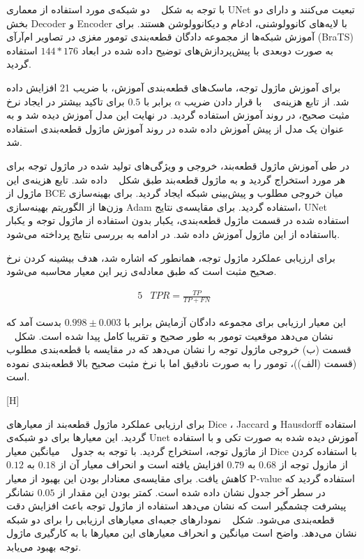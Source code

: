 
با توجه به شکل ~ دو شبکه‌ی مورد استفاده از معماری UNet تبعیت می‌کنند و دارای دو بخش Decoder و Encoder با لایه‌های کانوولوشنی، ادغام و دیکانوولوشن هستند. برای آموزش شبکه‌ها از مجموعه دادگان قطعه‌بندی تومور مغزی در تصاویر ام‌آرآی (BraTS) به صورت دوبعدی با پیش‌پردازش‌های توضیح داده شده در ابعاد $144*176$ استفاده گردید.

برای آموزش ماژول توجه، ماسک‌های قطعه‌بندی آموزش، با ضریب 21 افزایش داده‌ شد. از تابع هزینه‌ی ~ با قرار دادن ضریب $\alpha$ برابر با $0.5$ برای تاکید بیشتر در ایجاد نرخ مثبت صحیح، در روند آموزش استفاده گردید. در نهایت این مدل آموزش دیده شد و به عنوان یک مدل از پیش آموزش داده شده در روند آموزش ماژول قطعه‌بندی استفاده شد. 

در طی آموزش ماژول قطعه‌بند، خروجی و ویژگی‌های تولید شده در ماژول توجه برای هر مورد استخراج گردید و به ماژول قطعه‌بند طبق شکل ~ داده شد. تابع هزینه‌ی این ماژول از BCE میان خروجی مطلوب و پیش‌بینی شبکه ایجاد گردید. برای بهینه‌سازی وزن‌ها از الگوریتم بهینه‌سازی Adam استفاده گردید. برای مقایسه‌ی نتایج، UNet استفاده شده در قسمت ماژول قطعه‌بندی، یکبار بدون استفاده از ماژول توجه و یکبار بااستفاده از این ماژول آموزش داده شد. در ادامه به بررسی نتایج پرداخته می‌شود.


برای ارزیابی عملکرد ماژول توجه، همانطور که اشاره شد، هدف بیشینه کردن نرخ صحیح مثبت است که طبق معادله‌ی زیر این معیار محاسبه می‌شود.

\begin{alignat}{5}
	&TPR = \frac{TP}{TP+FN} \label{tpr} && 
\end{alignat}

این معیار ارزیابی برای مجموعه دادگان آزمایش برابر با $0.998 \pm   0.003$ بدست آمد که نشان می‌دهد موقعیت تومور به طور صحیح و تقریبا کامل پیدا شده است. شکل ~ قسمت (ب) خروجی ماژول توجه را نشان می‌دهد که در مقایسه با قطعه‌بندی مطلوب (قسمت (الف))، تومور را به صورت نادقیق اما با نرخ مثبت صحیح بالا قطعه‌بندی نموده است.

[H]

برای ارزیابی عملکرد ماژول قطعه‌بند از معیارهای Dice ، Jaccard و Hausdorff استفاده گردید. این معیارها برای دو شبکه‌ی Unet آموزش دیده شده به صورت تکی و با استفاده از ماژول توجه، استخراج گردید. با توجه به جدول ~ میانگین معیار Dice با استفاده کردن از مازول توجه از $0.68$ به $0.79$ افزایش یافته است و انحراف معیار آن از $0.18$ به $0.12$ کاهش یافت. برای مقایسه‌ی معنادار بودن این بهبود از معیار P-value استفاده گردید که در سطر آخر جدول نشان داده شده است. کمتر بودن این مقدار از $0.05$ نشانگر پیشرفت چشمگیر است که نشان می‌دهد استفاده از ماژول توجه باعث افزایش دقت قطعه‌بندی می‌شود. شکل ~ نمودارهای جعبه‌ای معیارهای ارزیابی را برای دو شبکه نشان می‌دهد. واضح است میانگین و انحراف معیارهای این معیارها با به کارگیری ماژول توجه بهبود می‌یابد.

